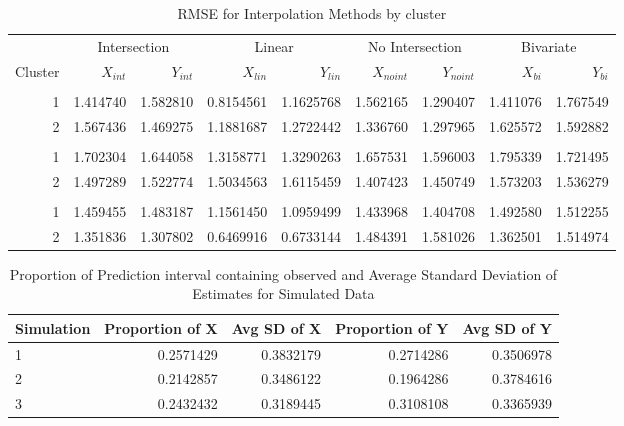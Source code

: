 \documentclass[12pt]{article}
\begin{document}
\begin{table}

\caption{\label{tab:results-table-by-clust}RMSE for Interpolation Methods by cluster}
\centering
\begin{tabular}[t]{rrrrrrrrr}
\toprule
\multicolumn{1}{c}{ } & \multicolumn{2}{c}{Intersection} & \multicolumn{2}{c}{Linear} & \multicolumn{2}{c}{No Intersection} & \multicolumn{2}{c}{Bivariate} \\
\cmidrule(l{3pt}r{3pt}){2-3} \cmidrule(l{3pt}r{3pt}){4-5} \cmidrule(l{3pt}r{3pt}){6-7} \cmidrule(l{3pt}r{3pt}){8-9}
Cluster & $X_{int}$ & $Y_{int}$ & $X_{lin}$ & $Y_{lin}$ & $X_{no int}$ & $Y_{no int}$ & $X_{bi}$ & $Y_{bi}$\\
\midrule
\addlinespace[0.3em]
\multicolumn{9}{l}{\textbf{Simulation 1}}\\
\hspace{1em}1 & 1.414740 & 1.582810 & 0.8154561 & 1.1625768 & 1.562165 & 1.290407 & 1.411076 & 1.767549\\
\hspace{1em}2 & 1.567436 & 1.469275 & 1.1881687 & 1.2722442 & 1.336760 & 1.297965 & 1.625572 & 1.592882\\
\addlinespace[0.3em]
\multicolumn{9}{l}{\textbf{Simulation 2}}\\
\hspace{1em}1 & 1.702304 & 1.644058 & 1.3158771 & 1.3290263 & 1.657531 & 1.596003 & 1.795339 & 1.721495\\
\hspace{1em}2 & 1.497289 & 1.522774 & 1.5034563 & 1.6115459 & 1.407423 & 1.450749 & 1.573203 & 1.536279\\
\addlinespace[0.3em]
\multicolumn{9}{l}{\textbf{Simulation 3}}\\
\hspace{1em}1 & 1.459455 & 1.483187 & 1.1561450 & 1.0959499 & 1.433968 & 1.404708 & 1.492580 & 1.512255\\
\hspace{1em}2 & 1.351836 & 1.307802 & 0.6469916 & 0.6733144 & 1.484391 & 1.581026 & 1.362501 & 1.514974\\
\bottomrule
\end{tabular}
\end{table}

\begin{table}

\caption{\label{tab:cp-table-sim}Proportion of Prediction interval containing observed and Average Standard Deviation of Estimates for Simulated Data}
\centering
\begin{tabular}[t]{lrrrr}
\toprule
Simulation & Proportion of X & Avg SD of X & Proportion of Y & Avg SD of Y\\
\midrule
1 & 0.2571429 & 0.3832179 & 0.2714286 & 0.3506978\\
2 & 0.2142857 & 0.3486122 & 0.1964286 & 0.3784616\\
3 & 0.2432432 & 0.3189445 & 0.3108108 & 0.3365939\\
\bottomrule
\end{tabular}
\end{table}
\end{document}
